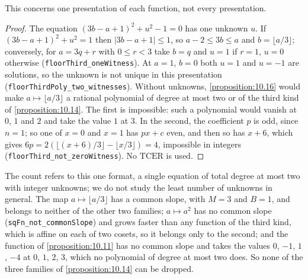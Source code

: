 This concerns one presentation of each function, not every presentation.


\begin{proof}
The equation $(3b - a + 1)^{2} + u^{2} - 1 = 0$ has one unknown $u$. If $(3b - a + 1)^{2} + u^{2} = 1$ then $|3b - a + 1| ≤ 1$, so $a - 2 ≤ 3b ≤ a$ and $b = ⌊a/3⌋$; conversely, for $a = 3q + r$ with $0 ≤ r < 3$ take $b = q$ and $u = 1$ if $r = 1$, $u = 0$ otherwise (\texttt{floorThird\_oneWitness}). At $a = 1$, $b = 0$ both $u = 1$ and $u = -1$ are solutions, so the unknown is not unique in this presentation (\texttt{floorThirdPoly\_two\_witnesses}). Without unknowns, \cref{proposition:10.16} would make $a ↦ ⌊a/3⌋$ a rational polynomial of degree at most two or of the third kind of \cref{proposition:10.14}. The first is impossible: such a polynomial would vanish at $0$, $1$ and $2$ and take the value $1$ at $3$. In the second, the coefficient $p$ is odd, since $n = 1$; so one of $x = 0$ and $x = 1$ has $px + c$ even, and then so has $x + 6$, which gives $6p = 2(⌊(x + 6)/3⌋ - ⌊x/3⌋) = 4$, impossible in integers (\texttt{floorThird\_not\_zeroWitness}). No $\mathrm{TCER}$ is used.
\end{proof}

The count refers to this one format, a single equation of total degree at most two with integer unknowns; we do not study the least number of unknowns in general. The map $a ↦ ⌊a/3⌋$ has a common slope, with $M = 3$ and $B = 1$, and belongs to neither of the other two families; $a ↦ a^{2}$ has no common slope (\texttt{sqFn\_not\_commonSlope}) and grows faster than any function of the third kind, which is affine on each of two cosets, so it belongs only to the second; and the function of \cref{proposition:10.11} has no common slope and takes the values $0$, $-1$, $1$, $-4$ at $0$, $1$, $2$, $3$, which no polynomial of degree at most two does. So none of the three families of \cref{proposition:10.14} can be dropped.
